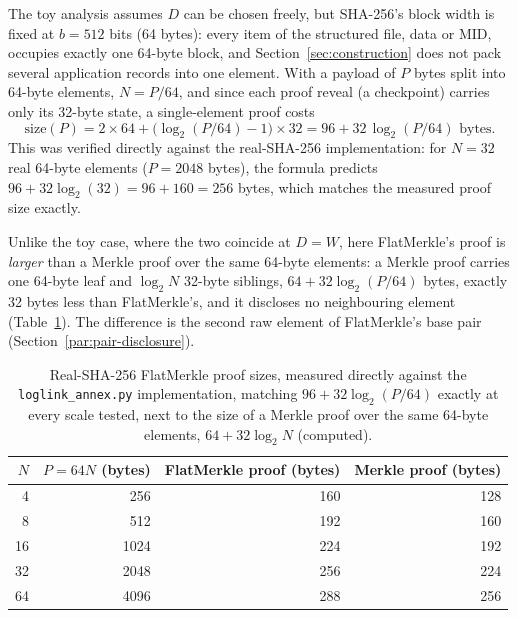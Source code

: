 The toy analysis assumes $D$ can be chosen freely, but SHA-256's block
width is fixed at $b=512$ bits (64 bytes): every item of the structured
file, data or $\mathrm{MID}$, occupies exactly one 64-byte block, and
Section~\ref{sec:construction} does not pack several application records
into one element. With a payload of $P$ bytes split into 64-byte elements,
$N = P/64$, and since each proof reveal (a checkpoint) carries only its
32-byte state, a single-element proof costs
\begin{equation}
\mathrm{size}(P) = 2 \times 64 + \big(\log_2(P/64) - 1\big) \times 32
= 96 + 32\,\log_2(P/64) \text{ bytes}.
\end{equation}
This was verified directly against the real-SHA-256 implementation: for
$N=32$ real 64-byte elements ($P = 2048$ bytes), the formula predicts
$96 + 32\log_2(32) = 96 + 160 = 256$ bytes, which matches the measured
proof size exactly.

Unlike the toy case, where the two coincide at $D=W$, here FlatMerkle's
proof is \emph{larger} than a Merkle proof over the same 64-byte elements:
a Merkle proof carries one 64-byte leaf and $\log_2 N$ 32-byte siblings,
$64 + 32\log_2(P/64)$ bytes, exactly 32 bytes less than FlatMerkle's, and
it discloses no neighbouring element
(Table~\ref{tab:real-sha256-sizes}). The difference is the second raw
element of FlatMerkle's base pair (Section~\ref{par:pair-disclosure}).

\begin{table}[htbp]
\centering
\begin{tabular}{@{}rrrr@{}}
\toprule
$N$ & $P = 64N$ (bytes) & FlatMerkle proof (bytes) & Merkle proof (bytes) \\
\midrule
4  & 256  & 160 & 128 \\
8  & 512  & 192 & 160 \\
16 & 1024 & 224 & 192 \\
32 & 2048 & 256 & 224 \\
64 & 4096 & 288 & 256 \\
\bottomrule
\end{tabular}
\caption{Real-SHA-256 FlatMerkle proof sizes, measured directly against the
\texttt{loglink\_annex.py} implementation, matching
$96 + 32\log_2(P/64)$ exactly at every scale tested, next to the size of a
Merkle proof over the same 64-byte elements, $64 + 32\log_2 N$ (computed).}
\label{tab:real-sha256-sizes}
\end{table}

